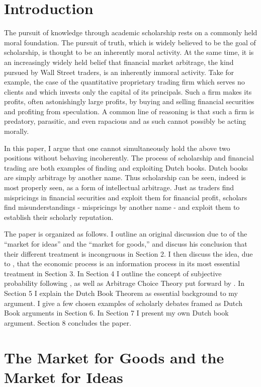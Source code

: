 \documentclass[11pt,]{article}
\begin{document}
\section{Introduction}\label{introduction}

The pursuit of knowledge through academic scholarship rests on a
commonly held moral foundation. The pursuit of truth, which is widely
believed to be the goal of scholarship, is thought to be an inherently
moral activity. At the same time, it is an increasingly widely held
belief that financial market arbitrage, the kind pursued by Wall Street
traders, is an inherently immoral activity. Take for example, the case
of the quantitative proprietary trading firm which serves no clients and
which invests only the capital of its principals. Such a firm makes its
profits, often astonishingly large profits, by buying and selling
financial securities and profiting from speculation. A common line of
reasoning is that such a firm is predatory, parasitic, and even
rapacious and as such cannot possibly be acting morally.

In this paper, I argue that one cannot simultaneously hold the above two
positions without behaving incoherently. The process of scholarship and
financial trading are both examples of finding and exploiting Dutch
books. Dutch books are simply arbitrage by another name. Thus
scholarship can be seen, indeed is most properly seen, as a form of
intellectual arbitrage. Just as traders find mispricings in financial
securities and exploit them for financial profit, scholars find
misunderstandings - mispricings by another name - and exploit them to
establish their scholarly reputation.

The paper is organized as follows. I outline an original discussion due
to \citet{Coase1974} of the ``market for ideas'' and the ``market for
goods,'' and discuss his conclusion that their different treatment is
incongruous in Section 2. I then discuss the idea, due to
\citet{Hayek1945}, that the economic process is an information process
in its most essential treatment in Section 3. In Section 4 I outline the
concept of subjective probability following \citet{deFinetti1937}, as
well as Arbitrage Choice Theory put forward by \citet{Nau1999}. In
Section 5 I explain the Dutch Book Theorem as essential background to my
argument. I give a few chosen examples of scholarly debates framed as
Dutch Book arguments in Section 6. In Section 7 I present my own Dutch
book argument. Section 8 concludes the paper.

\section{The Market for Goods and the Market for
Ideas}\label{the-market-for-goods-and-the-market-for-ideas}
\end{document}
